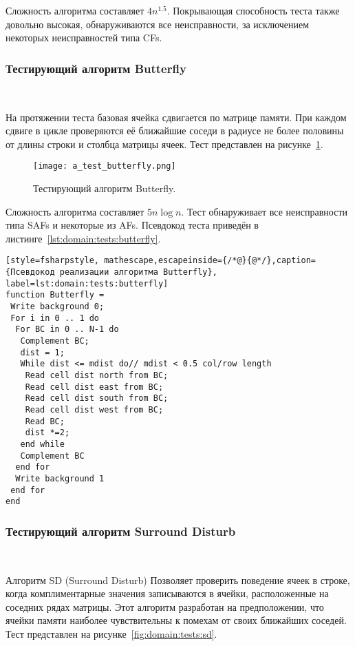 Сложность алгоритма составляет $ 4n^{1.5} $. Покрывающая способность теста также довольно высокая, обнаруживаются все неисправности, за исключением некоторых неисправностей типа CFs.

\subsubsection{Тестирующий алгоритм Butterfly}~\\
\label{page:domain:tests:butterfly}

На протяжении теста базовая ячейка сдвигается по матрице памяти. При каждом сдвиге в цикле проверяются её ближайшие соседи в радиусе не более половины от длины строки и столбца матрицы ячеек. Тест представлен на рисунке~\ref{fig:domain:tests:butterfly}. 

\begin{figure}[ht]
\centering
  \texttt{[image: a\_test\_butterfly.png]}  
  \caption{ Тестирующий алгоритм Butterfly. }
  \label{fig:domain:tests:butterfly}
\end{figure} 

Сложность алгоритма составляет $ 5n \log n $. Тест обнаруживает все неисправности типа SAFs и некоторые из AFs. Псевдокод теста приведён в листинге~\ref{lst:domain:tests:butterfly}.

\begin{lstlisting}[style=fsharpstyle, mathescape,escapeinside={/*@}{@*/},caption={Псевдокод реализации алгоритма Butterfly}, label=lst:domain:tests:butterfly]
function Butterfly =
 Write background 0;
 For i in 0 .. 1 do
  For BC in 0 .. N-1 do
   Complement BC;
   dist = 1; 
   While dist <= mdist do// mdist < 0.5 col/row length
    Read cell dist north from BC;
    Read cell dist east from BC;
    Read cell dist south from BC;
    Read cell dist west from BC;
    Read BC; 
    dist *=2;
   end while
   Complement BC
  end for
  Write background 1
 end for
end
\end{lstlisting}

\subsubsection{Тестирующий алгоритм Surround Disturb}~\\
\label{page:domain:tests:sd}

Алгоритм SD (Surround Disturb) Позволяет проверить поведение ячеек в строке, когда комплиментарные значения записываются в ячейки, расположенные на соседних рядах матрицы. Этот алгоритм разработан на предположении, что ячейки памяти наиболее чувствительны к помехам от своих ближайших соседей. Тест представлен на рисунке~\ref{fig:domain:tests:sd}. 

